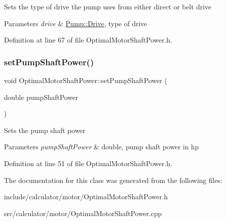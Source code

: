 Sets the type of drive the pump uses from either direct or belt drive 
\begin{DoxyParams}{Parameters}
{\em drive} & \hyperlink{class_pump_a32bf0ade131a11bb3b3fb374f638e983}{Pump\+::\+Drive}, type of drive \\
\hline
\end{DoxyParams}


Definition at line 67 of file Optimal\+Motor\+Shaft\+Power.\+h.

\mbox{\label{class_optimal_motor_shaft_power_ab2d80927fbaa62705359700b2a8f2f26}} 
\subsubsection{\texorpdfstring{set\+Pump\+Shaft\+Power()}{setPumpShaftPower()}}
{\footnotesize\ttfamily void Optimal\+Motor\+Shaft\+Power\+::set\+Pump\+Shaft\+Power (\begin{DoxyParamCaption}\item[{double}]{pump\+Shaft\+Power }\end{DoxyParamCaption})\hspace{0.3cm}{\ttfamily [inline]}}

Sets the pump shaft power 
\begin{DoxyParams}{Parameters}
{\em pump\+Shaft\+Power} & double, pump shaft power in hp \\
\hline
\end{DoxyParams}


Definition at line 51 of file Optimal\+Motor\+Shaft\+Power.\+h.



The documentation for this class was generated from the following files\+:\begin{DoxyCompactItemize}
\item 
include/calculator/motor/Optimal\+Motor\+Shaft\+Power.\+h\item 
src/calculator/motor/Optimal\+Motor\+Shaft\+Power.\+cpp\end{DoxyCompactItemize}
